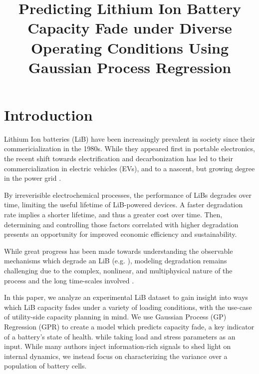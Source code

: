 \documentclass[conference]{IEEEtran}
\begin{document}
\title{Predicting Lithium Ion Battery Capacity Fade under Diverse Operating Conditions Using Gaussian Process Regression}

\author{
}

\maketitle

\begin{abstract}
\end{abstract}



\section{Introduction}

Lithium Ion batteries (LiB) have been increasingly prevalent in society since their
commericialization in the 1980s. While they appeared first in portable electronics,
the recent shift towards electrification and decarbonization has 
led to their commercialization in electric vehicles (EVs), and to a nascent, but growing degree in the power
grid \cite{noauthor_battery_2015}. 

By irreverisible electrochemical processes, the performance of
LiBs degrades over time, limiting the useful lifetime of LiB-powered devices. 
A faster degradation rate implies a shorter lifetime, and thus a greater
cost over time. Then, determining and controlling those factors correlated
with higher degradation presents an opportunity for improved economic
efficiency\cite{reniers_improving_2018} and sustainability.

While great progress has been made towards understanding the observable
mechanisms which degrade an LiB (e.g. \cite{dubarry_synthesize_2012}\cite{birkl_degradation_2017}), 
modeling degradation remains challenging due to the complex, nonlinear, and 
multiphysical nature of the process and the long time-scales involved \cite{severson_data-driven_2019}.

In this paper, we analyze an experimental LiB
dataset to gain insight into ways which LiB capacity fades under
a variety of loading conditions, with the use-case of utility-side capacity planning in mind.
We use Gaussian Process (GP) Regression (GPR) to create a
model which predicts capacity fade, a key indicator of a battery's state of health.
while taking load and stress parameters as an input. While many
authors inject information-rich signals to shed light on internal dynamics, we instead
focus on characterizing the variance over a population of battery cells.
\end{document}
